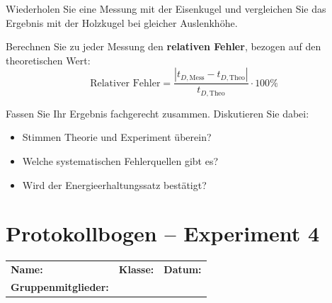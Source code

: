 \documentclass[11pt,a4paper]{scrartcl}
\begin{document}
	\begin{aufgabe}[title={\faIcon{pencil-alt} Aufgabe 6: Massenunabhängigkeit}]
		Wiederholen Sie eine Messung mit der Eisenkugel und vergleichen Sie das Ergebnis mit der Holzkugel bei gleicher Auslenkhöhe.
	\end{aufgabe}
	
	\begin{aufgabe}[title={\faIcon{pencil-alt} Aufgabe 7: Fehleranalyse}]
		Berechnen Sie zu jeder Messung den \textbf{relativen Fehler}, bezogen auf den theoretischen Wert:
		\begin{equation*}
			\text{Relativer Fehler} = \frac{|t_{D,\text{Mess}} - t_{D,\text{Theo}}|}{t_{D,\text{Theo}}} \cdot 100\%
		\end{equation*}
	\end{aufgabe}
	
	\begin{sternaufgabe}[title={\faIcon{star} Aufgabe 8: Zusammenfassung}]
		Fassen Sie Ihr Ergebnis fachgerecht zusammen. Diskutieren Sie dabei:
		\begin{itemize}
			\item Stimmen Theorie und Experiment überein?
			\item Welche systematischen Fehlerquellen gibt es?
			\item Wird der Energieerhaltungssatz bestätigt?
		\end{itemize}
	\end{sternaufgabe}
	
	\newpage
	\section*{Protokollbogen -- Experiment 4}
	
	\begin{center}
		\begin{tcolorbox}[colback=white, colframe=black, width=\textwidth, boxrule=0.5pt]
			\begin{tabular}{@{}p{0.32\textwidth}p{}p{}@{}}
				\textbf{Name:} \hrulefill & \textbf{Klasse:} \hrulefill & \textbf{Datum:} \hrulefill \\[0.4cm]
				\textbf{Gruppenmitglieder:} & \multicolumn{2}{l}{\hrulefill} \\
			\end{tabular}
		\end{tcolorbox}
	\end{center}
	
\end{document}
